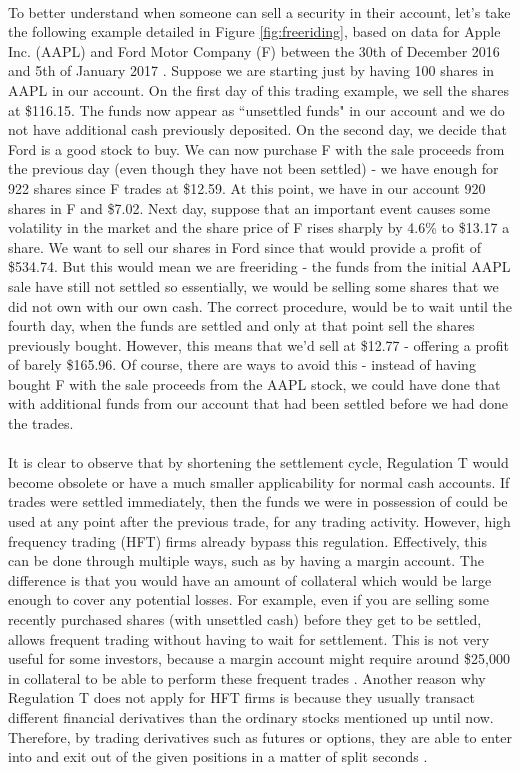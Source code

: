 \documentclass[12pt,twoside]{article}
\begin{document}
\\
To better understand when someone can sell a security in their account, let's take the following example detailed in Figure \ref{fig:freeriding}, based on data for Apple Inc. (AAPL) and Ford Motor Company (F) between the 30th of December 2016 and 5th of January 2017 \cite{yahoo}. Suppose we are starting just by having 100 shares in AAPL in our account. On the first day of this trading example, we sell the shares at \$116.15. The funds now appear as ``unsettled funds" in our account and we do not have additional cash previously deposited. On the second day, we decide that Ford is a good stock to buy. We can now purchase F with the sale proceeds from the previous day (even though they have not been settled) - we have enough for 922 shares since F trades at \$12.59. At this point, we have in our account 920 shares in F and \$7.02. Next day, suppose that an important event causes some volatility in the market and the share price of F rises sharply by 4.6\% to \$13.17 a share. We want to sell our shares in Ford since that would provide a profit of \$534.74. But this would mean we are freeriding - the funds from the initial AAPL sale have still not settled so essentially, we would be selling some shares that we did not own with our own cash. The correct procedure, would be to wait until the fourth day, when the funds are settled and only at that point sell the shares previously bought. However, this means that we'd sell at \$12.77 - offering a profit of barely \$165.96. Of course, there are ways to avoid this - instead of having bought F with the sale proceeds from the AAPL stock, we could have done that with additional funds from our account that had been settled before we had done the trades.
\\ \\
It is clear to observe that by shortening the settlement cycle, Regulation T would become obsolete or have a much smaller applicability for normal cash accounts. If trades were settled immediately, then the funds we were in possession of could be used at any point after the previous trade, for any trading activity. However, high frequency trading (HFT) firms already bypass this regulation. Effectively, this can be done through multiple ways, such as by having a margin account. The difference is that you would have an amount of collateral which would be large enough to cover any potential losses. For example, even if you are selling some recently purchased shares (with unsettled cash) before they get to be settled, allows frequent trading without having to wait for settlement. This is not very useful for some investors, because a margin account might require around \$25,000 in collateral to be able to perform these frequent trades \cite{marginACCT}. Another reason why Regulation T does not apply for HFT firms is because they usually transact different financial derivatives than the ordinary stocks mentioned up until now. Therefore, by trading derivatives such as futures or options, they are able to enter into and exit out of the given positions in a matter of split seconds \cite{marginEXP}. 
\end{document}
